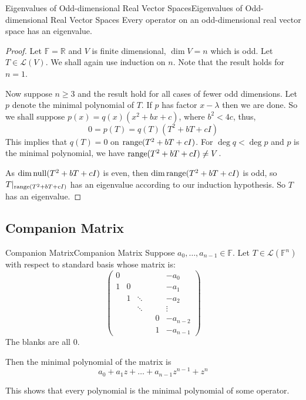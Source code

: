 \documentclass[../main.tex]{subfiles}
\begin{document}
\begin{theorem}{Eigenvalues of Odd-dimensional Real Vector Spaces}{Eigenvalues of Odd-dimensional Real Vector Spaces}
Every operator on an odd-dimensional real vector space has an eigenvalue.
\end{theorem}
\begin{proof}
Let $\mathbb{F}=\mathbb{R}$ and $V$ is finite dimensional, $\dim V=n$ which is odd. Let $T\in \mathscr{L}(V)$. We shall again use induction on $n$. Note that the result holds for $n=1$.

Now suppose $n\geq 3$ and the result hold for all cases of fewer odd dimensions. Let  $p$ denote the minimal polynomial of $T$. If $p$ has factor $x-\lambda$ then we are done. So we shall suppose $p(x) = q(x)(x^2+bx+c)$, where  $b ^2<4c$, thus,
\begin{equation*}
0=p(T) = q(T)(T^2+bT+cI)
\end{equation*}
This implies that $q(T)=0$ on $\operatorname{range} (T^2+bT+cI)$. For $\deg q<\deg p$ and $p$ is the minimal polynomial, we have $\operatorname{range} (T^2+bT+cI)\neq V$.

As $\dim \operatorname{null} (T^2+bT+cI)$ is even, then $\dim \operatorname{range} (T^2+bT+cI)$ is odd, so $T|_{\operatorname{range} (T^2+bT+cI)}$ has an eigenvalue according to our induction hypothesis. So $T$ has an eigenvalue.
\end{proof}

\subsection{Companion Matrix}
\begin{definition}{Companion Matrix}{Companion Matrix}
Suppose $a_0, \ldots ,a_{n-1}\in \mathbb{F}$. Let $T\in \mathscr{L}(\mathbb{F}^n)$ with respect to standard basis whose matrix is:
\begin{equation*}
\begin{pmatrix}
	0& & & & &-a_0\\
	1&0& & & &-a_1\\
	 &1&\ddots & & &-a_2\\
	 & & \ddots & & & \vdots \\
	 & & & &0&-a_{n-2}\\
	 & & & &1&-a_{n-1}
\end{pmatrix}
\end{equation*}
The blanks are all $0$.

Then the minimal polynomial of the matrix is
\begin{equation*}
a_0+a_1z+\ldots +a_{n-1}z^{n-1}+z^n
\end{equation*}
\end{definition}
This shows that every polynomial is the minimal polynomial of some operator.
\end{document}
